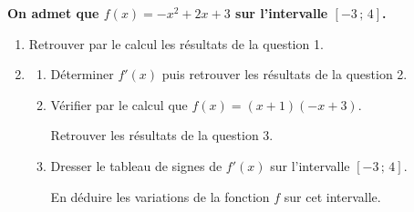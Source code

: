 \textbf{On admet que $f(x)=-x^2+2x+3$ sur l'intervalle $[-3\,;\,4]$.}
\begin{enumerate}[resume]
\item Retrouver par le calcul les résultats de la question 1.
\item
\begin{enumerate}[label=\alph*)]
\item Déterminer $f'(x)$ puis retrouver les résultats de la question 2.
\item Vérifier par le calcul que $f(x)=(x+1)(-x+3)$.\par Retrouver les résultats de la question 3.
\item Dresser le tableau de signes de $f'(x)$ sur l'intervalle $[-3\,;\,4]$.\par En déduire les variations de la fonction $f$ sur cet intervalle.
\end{enumerate}
\end{enumerate}

\bigskip
